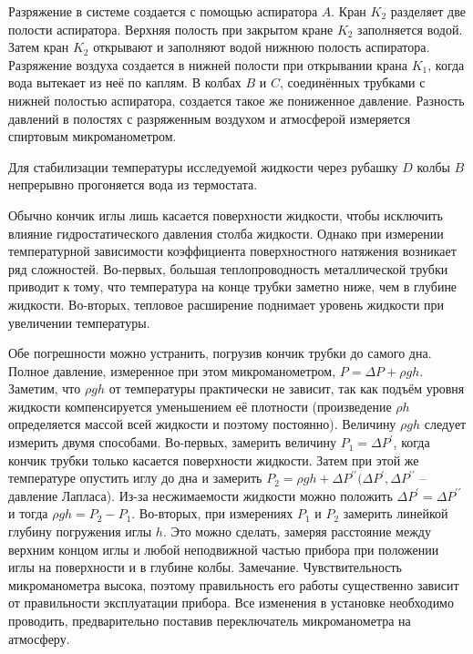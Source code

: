 \documentclass[a4paper,12pt]{article} %
\begin{document}
{\medskip

\noindent Разряжение в системе создается с помощью аспиратора $A$. Кран $K_{2}$ разделяет две полости аспиратора. Верхняя полость при закрытом кране $K_{2}$  заполняется водой. Затем кран $K_{2}$ открывают и заполняют водой  нижнюю полость  аспиратора.  Разряжение воздуха создается в нижней полости  при открывании крана $K_{1}$, когда  вода вытекает из неё по каплям. В колбах $B$ и $C$, соединённых трубками с нижней полостью аспиратора,  создается такое же пониженное давление. Разность давлений в полостях с разряженным воздухом и атмосферой измеряется спиртовым микроманометром.

\medskip
 
\noindent Для стабилизации температуры исследуемой жидкости через рубашку $D$ колбы $B$ непрерывно прогоняется вода из термостата.

\medskip

\noindent Обычно кончик иглы лишь касается поверхности жидкости, чтобы исключить влияние гидростатического давления столба жидкости. Однако при измерении температурной зависимости коэффициента поверхностного натяжения возникает ряд сложностей. Во-первых, большая теплопроводность металлической трубки приводит к тому, что температура на конце трубки заметно ниже, чем в глубине жидкости. Во-вторых, тепловое расширение поднимает уровень жидкости при увеличении температуры. 

\medskip

\noindent Обе погрешности можно устранить, погрузив кончик трубки до самого дна. Полное давление, измеренное при этом микроманометром, $P = \Delta P + \rho gh$. Заметим, что $\rho gh$ от температуры практически не зависит, так как подъём уровня жидкости компенсируется уменьшением её плотности (произведение $\rho h$ определяется массой всей жидкости и поэтому постоянно). Величину  $\rho gh$ следует измерить двумя способами. Во-первых, замерить величину $P_{1}= \Delta P^\prime$, когда кончик трубки только касается поверхности жидкости. Затем при этой же температуре опустить иглу до дна и замерить $P_{2}= \rho gh + \Delta P^{\prime\prime} (\Delta P^\prime, \Delta P^{\prime\prime}$ – давление Лапласа). Из-за  несжимаемости  жидкости можно положить $\Delta P^\prime = \Delta P^{\prime\prime}$ и тогда $\rho gh = P_{2} - P_{1}$. Во-вторых, при измерениях $P_{1}$ и $P_{2}$ замерить линейкой  глубину погружения иглы $h$. Это можно сделать, замеряя расстояние между верхним концом иглы и любой неподвижной частью прибора при положении иглы на поверхности и в глубине колбы.
Замечание. Чувствительность микроманометра высока, поэтому правильность его работы существенно зависит от правильности  эксплуатации прибора. Все изменения в установке необходимо проводить, предварительно поставив переключатель микроманометра на атмосферу.

}
\end{document}
